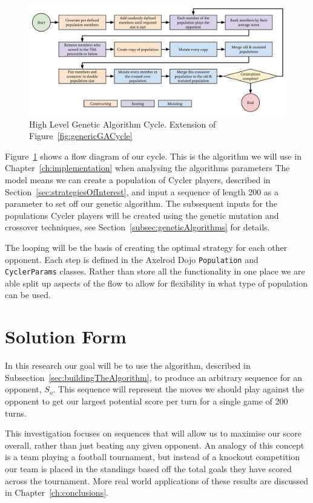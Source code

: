 \begin{figure}[ht]
    \includegraphics[width=1.0\textwidth, center]{./img/flows/custom_ga_cycle}
    \caption{High Level Genetic Algorithm Cycle. Extension of Figure~\ref{fig:genericGACycle}}\label{fig:customGAcycle}
\end{figure}

Figure~\ref{fig:customGAcycle} shows a flow diagram of our cycle.
This is the algorithm we will use in Chapter~\ref{ch:implementation} when analysing the algorithms parameters
The model means we can create a population of Cycler players, described in Section~\ref{sec:strategiesOfInterest}, and input a sequence of length 200 as a parameter to set off our genetic algorithm.
The subsequent inputs for the populations Cycler players will be created using the genetic mutation and crossover techniques, see Section~\ref{subsec:geneticAlgorithms} for details.

The looping will be the basis of creating the optimal strategy for each other opponent.
Each step is defined in the Axelrod Dojo \texttt{Population} and \texttt{CyclerParams} classes.
Rather than store all the functionality in one place we are able split up aspects of the flow to allow for flexibility in what type of population can be used.

\section{Solution Form}\label{sec:solutionForm}
In this research our goal will be to use the algorithm, described in Subsection~\ref{sec:buildingTheAlgorithm}, to produce an arbitrary sequence for an opponent, \(S_o\).
This sequence will represent the moves we should play against the opponent to get our largest potential score per turn for a single game of 200 turns.

This investigation focuses on sequences that will allow us to maximise our score overall, rather than just beating any given opponent.
An analogy of this concept is a team playing a football tournament, but instead of a knockout competition our team is placed in the standings based off the total goals they have scored across the tournament.
More real world applications of these results are discussed in Chapter~\ref{ch:conclusions}.

